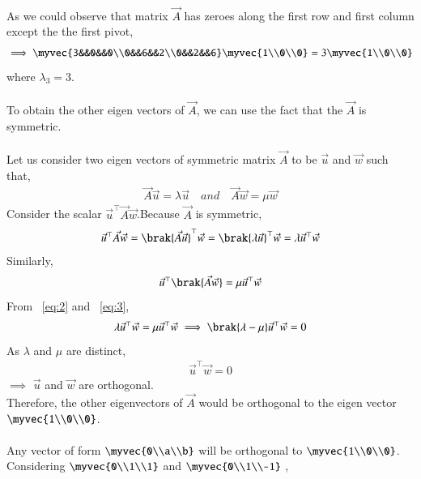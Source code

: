 \documentclass[journal]{IEEEtran}
\begin{document}
\\
As we could observe that matrix $\vec{A}$ has zeroes along the first row and first column except the the first pivot,
\begin{align}
     \implies \myvec{3&&0&&0\\0&&6&&2\\0&&2&&6}\myvec{1\\0\\0}=3\myvec{1\\0\\0}
\end{align}
where $\lambda_3=3$.\\
\\
To obtain the other eigen vectors of $\vec{A}$, we can use the fact that the $\vec{A}$ is symmetric.\\
\\
Let us consider two eigen vectors of symmetric matrix $\vec{A}$ to be $\vec{u}$ and $\vec{w}$ such that,
\begin{align}
    \vec{A}\vec{u}=\lambda\vec{u} \quad and \quad \vec{A}\vec{w}=\mu \vec{w}
\end{align}
Consider the scalar $\vec{u}^{\top}\vec{A}\vec{w}$.Because $\vec{A}$ is symmetric,
\begin{align}
    \vec{u}^{\top}\vec{A}\vec{w}=\brak{\vec{A}\vec{u}}^{\top}\vec{w}=\brak{\lambda \vec{u}}^{\top}\vec{w}=\lambda\vec{u}^{\top}\vec{w}
    \label{eq:2}
\end{align}
Similarly,
\begin{align}
    \vec{u}^{\top}\brak{\vec{A}\vec{w}}=\mu\vec{u}^{\top}\vec{w}
    \label{eq:3}
\end{align}
\newpage
\vspace*{0.25cm}
From ~\eqref{eq:2} and ~\eqref{eq:3},
\begin{align}
    \lambda\vec{u}^{\top}\vec{w}=\mu \vec{u}^{\top}\vec{w}
    \implies \brak{\lambda-\mu}\vec{u}^{\top}\vec{w}=0
\end{align}
As $\lambda$ and $\mu$ are distinct,
\begin{align}
    \vec{u}^{\top}\vec{w}=0
\end{align}
$\implies$ $\vec{u}$ and $\vec{w}$ are orthogonal.\\
Therefore, the other eigenvectors of $\vec{A}$ would be orthogonal to the eigen vector $\myvec{1\\0\\0}$.\\
\\
Any vector of form $\myvec{0\\a\\b}$ will be orthogonal to $\myvec{1\\0\\0}$. Considering $\myvec{0\\1\\1}$ and $\myvec{0\\1\\-1}$ , 
\end{document}
